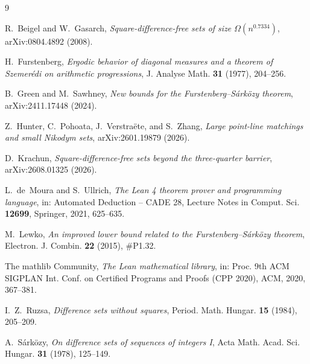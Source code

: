 \documentclass[11pt]{amsart}
\theoremstyle{plain}
\theoremstyle{remark}
\begin{document}
\begin{thebibliography}{9}

R.~Beigel and W.~Gasarch,
\emph{Square-difference-free sets of size $\Omega(n^{0.7334})$},
arXiv:0804.4892 (2008).

H.~Furstenberg,
\emph{Ergodic behavior of diagonal measures and a theorem of Szemer\'edi on
arithmetic progressions},
J. Analyse Math. \textbf{31} (1977), 204--256.

B.~Green and M.~Sawhney,
\emph{New bounds for the Furstenberg--S\'ark\"ozy theorem},
arXiv:2411.17448 (2024).

Z.~Hunter, C.~Pohoata, J.~Verstra\"ete, and S.~Zhang,
\emph{Large point-line matchings and small Nikodym sets},
arXiv:2601.19879 (2026).

D.~Krachun,
\emph{Square-difference-free sets beyond the three-quarter barrier},
arXiv:2608.01325 (2026).

L.~de~Moura and S.~Ullrich,
\emph{The Lean 4 theorem prover and programming language},
in: Automated Deduction -- CADE 28, Lecture Notes in Comput. Sci.
\textbf{12699}, Springer, 2021, 625--635.

M.~Lewko,
\emph{An improved lower bound related to the Furstenberg--S\'ark\"ozy
theorem},
Electron. J. Combin. \textbf{22} (2015), \#P1.32.

The mathlib Community,
\emph{The Lean mathematical library},
in: Proc. 9th ACM SIGPLAN Int. Conf. on Certified Programs and Proofs
(CPP 2020), ACM, 2020, 367--381.

I.~Z.~Ruzsa,
\emph{Difference sets without squares},
Period. Math. Hungar. \textbf{15} (1984), 205--209.

A.~S\'ark\"ozy,
\emph{On difference sets of sequences of integers I},
Acta Math. Acad. Sci. Hungar. \textbf{31} (1978), 125--149.

\end{thebibliography}
\end{document}
